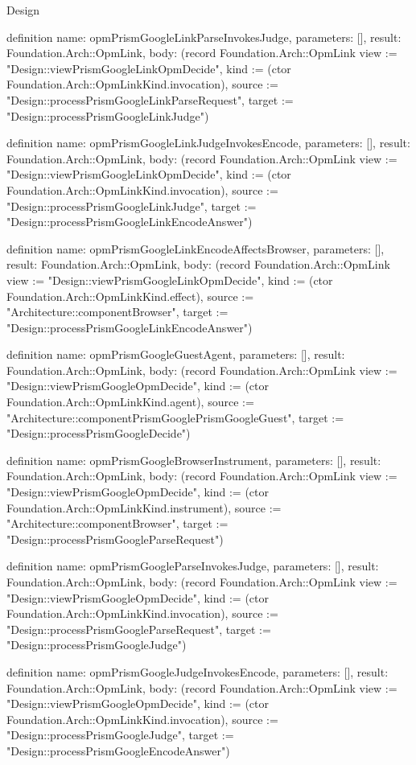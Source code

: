 \begin{lexlean}{Design}
\begin{semanticmodule}
definition{
  name: opmPrismGoogleLinkParseInvokesJudge,
  parameters: [],
  result: Foundation.Arch::OpmLink,
  body: (record Foundation.Arch::OpmLink {view := "Design::viewPrismGoogleLinkOpmDecide", kind := (ctor Foundation.Arch::OpmLinkKind.invocation), source := "Design::processPrismGoogleLinkParseRequest", target := "Design::processPrismGoogleLinkJudge"})
}

definition{
  name: opmPrismGoogleLinkJudgeInvokesEncode,
  parameters: [],
  result: Foundation.Arch::OpmLink,
  body: (record Foundation.Arch::OpmLink {view := "Design::viewPrismGoogleLinkOpmDecide", kind := (ctor Foundation.Arch::OpmLinkKind.invocation), source := "Design::processPrismGoogleLinkJudge", target := "Design::processPrismGoogleLinkEncodeAnswer"})
}

definition{
  name: opmPrismGoogleLinkEncodeAffectsBrowser,
  parameters: [],
  result: Foundation.Arch::OpmLink,
  body: (record Foundation.Arch::OpmLink {view := "Design::viewPrismGoogleLinkOpmDecide", kind := (ctor Foundation.Arch::OpmLinkKind.effect), source := "Architecture::componentBrowser", target := "Design::processPrismGoogleLinkEncodeAnswer"})
}

definition{
  name: opmPrismGoogleGuestAgent,
  parameters: [],
  result: Foundation.Arch::OpmLink,
  body: (record Foundation.Arch::OpmLink {view := "Design::viewPrismGoogleOpmDecide", kind := (ctor Foundation.Arch::OpmLinkKind.agent), source := "Architecture::componentPrismGooglePrismGoogleGuest", target := "Design::processPrismGoogleDecide"})
}

definition{
  name: opmPrismGoogleBrowserInstrument,
  parameters: [],
  result: Foundation.Arch::OpmLink,
  body: (record Foundation.Arch::OpmLink {view := "Design::viewPrismGoogleOpmDecide", kind := (ctor Foundation.Arch::OpmLinkKind.instrument), source := "Architecture::componentBrowser", target := "Design::processPrismGoogleParseRequest"})
}

definition{
  name: opmPrismGoogleParseInvokesJudge,
  parameters: [],
  result: Foundation.Arch::OpmLink,
  body: (record Foundation.Arch::OpmLink {view := "Design::viewPrismGoogleOpmDecide", kind := (ctor Foundation.Arch::OpmLinkKind.invocation), source := "Design::processPrismGoogleParseRequest", target := "Design::processPrismGoogleJudge"})
}

definition{
  name: opmPrismGoogleJudgeInvokesEncode,
  parameters: [],
  result: Foundation.Arch::OpmLink,
  body: (record Foundation.Arch::OpmLink {view := "Design::viewPrismGoogleOpmDecide", kind := (ctor Foundation.Arch::OpmLinkKind.invocation), source := "Design::processPrismGoogleJudge", target := "Design::processPrismGoogleEncodeAnswer"})
}


\end{semanticmodule}
\end{lexlean}
